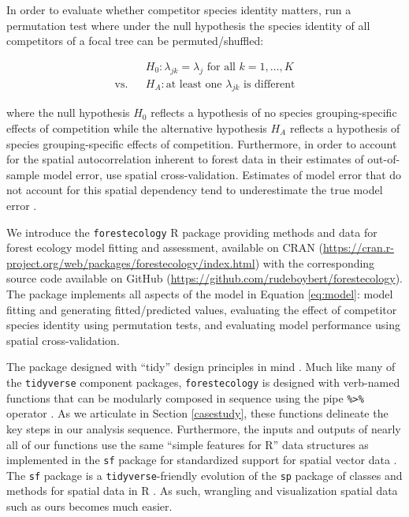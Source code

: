 \documentclass[12pt]{article}
\begin{document}
In order to evaluate whether competitor species identity matters,
\citet{allen_permutation_2020} run a permutation test where under the
null hypothesis the species identity of all competitors of a focal tree
can be permuted/shuffled:

\begin{eqnarray}
\label{eq:permutation-hypothesis-test}
&&H_0: \lambda_{jk} = \lambda_{j} \mbox{ for all } k = 1, \ldots, K\\
\text{vs.}&&H_A: \text{at least one } \lambda_{jk} \mbox{ is different}
\end{eqnarray}

where the null hypothesis \(H_0\) reflects a hypothesis of no species
grouping-specific effects of competition while the alternative
hypothesis \(H_A\) reflects a hypothesis of species grouping-specific
effects of competition. Furthermore, in order to account for the spatial
autocorrelation inherent to forest data in their estimates of
out-of-sample model error, \citet{allen_permutation_2020} use spatial
cross-validation. Estimates of model error that do not account for this
spatial dependency tend to underestimate the true model error
\citep{roberts_cross-validation_2017}.

We introduce the \texttt{forestecology} R package providing methods and
data for forest ecology model fitting and assessment, available on CRAN
(\url{https://cran.r-project.org/web/packages/forestecology/index.html})
with the corresponding source code available on GitHub
(\url{https://github.com/rudeboybert/forestecology}). The package
implements all aspects of the model in Equation \ref{eq:model}: model
fitting and generating fitted/predicted values, evaluating the effect of
competitor species identity using permutation tests, and evaluating
model performance using spatial cross-validation.

The package designed with ``tidy'' design principles in mind
\citep{wickham_welcome_2019}. Much like many of the \texttt{tidyverse}
component packages, \texttt{forestecology} is designed with verb-named
functions that can be modularly composed in sequence using the pipe
\texttt{\%\textgreater{}\%} operator \citep{bache_pipe_2020}. As we
articulate in Section \ref{casestudy}, these functions delineate the key
steps in our analysis sequence. Furthermore, the inputs and outputs of
nearly all of our functions use the same ``simple features for R'' data
structures as implemented in the \texttt{sf} package for standardized
support for spatial vector data \citep{pebesma_simple_2018}. The
\texttt{sf} package is a \texttt{tidyverse}-friendly evolution of the
\texttt{sp} package of classes and methods for spatial data in R
\citep{pebesma_sp_2005}. As such, wrangling and visualization spatial
data such as ours becomes much easier.
\end{document}
